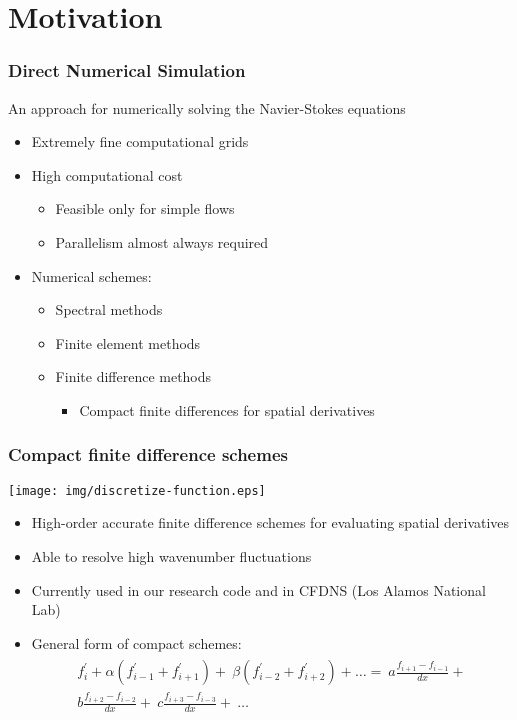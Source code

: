 
\section{Motivation}

\begin{frame}
\frametitle{Direct Numerical Simulation}

An approach for numerically solving
the Navier-Stokes equations

\begin{itemize}
\item Extremely fine computational grids
\item High computational cost
    \begin{itemize}
    \item Feasible only for simple flows
    \item Parallelism almost always required
    \end{itemize}
\item Numerical schemes:
    \begin{itemize}
    \item Spectral methods
    \item Finite element methods
    \item Finite difference methods
        \begin{itemize}
            \item Compact finite differences for spatial derivatives
        \end{itemize}
    \end{itemize}
\end{itemize}
\end{frame}

\begin{frame}
\frametitle{Compact finite difference schemes}
\centering
\texttt{[image: img/discretize-function.eps]}
\begin{itemize}
\item High-order accurate finite difference schemes
for evaluating spatial derivatives
\item Able to resolve high wavenumber fluctuations
\item Currently used in our research code
    and in CFDNS (Los Alamos National Lab)
\item {General form of compact schemes:
\begin{align*}
\begin{split}
f_i^{\prime} + \alpha(f^{\prime}_{i-1} + f^{\prime}_{i+1}) + \
\beta(f^{\prime}_{i-2} + f^{\prime}_{i+2}) + \hdots  = \
a\frac{f_{i+1} - f_{i-1}}{dx} + \\
b\frac{f_{i+2} - f_{i-2}}{dx} + \
c\frac{f_{i+3} - f_{i-3}}{dx} + \
    \hdots
\end{split}
\end{align*}}
\end{itemize}
\end{frame}


